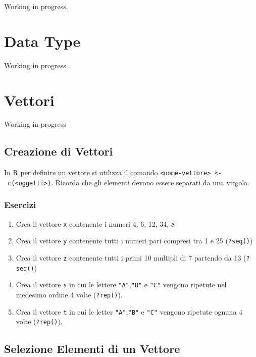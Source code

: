 \documentclass[
]{book}
\providecommand{\tightlist}{%
  \setlength{\itemsep}{0pt}\setlength{\parskip}{0pt}}
\begin{document}
Working in progress.

\hypertarget{data-type}{%
\chapter{Data Type}\label{data-type}}

Working in progress.

\hypertarget{vector}{%
\chapter{Vettori}\label{vector}}

Working in progress

\hypertarget{creazione-di-vettori}{%
\section{Creazione di Vettori}\label{creazione-di-vettori}}

In R per definire un vettore si utilizza il comando \texttt{\textless{}nome-vettore\textgreater{}\ \textless{}-\ c(\textless{}oggetti\textgreater{})}. Ricorda che gli elementi devono essere separati da una virgola.

\hypertarget{esercizi-2}{%
\subsection*{Esercizi}\label{esercizi-2}}

\begin{enumerate}
\def\labelenumi{\arabic{enumi}.}
\tightlist
\item
  Crea il vettore \texttt{x} contenente i numeri 4, 6, 12, 34, 8
\item
  Crea il vettore \texttt{y} contenente tutti i numeri pari compresi tra 1 e 25 (\texttt{?seq()})
\item
  Crea il vettore \texttt{z} contenente tutti i primi 10 multipli di 7 partendo da 13 (\texttt{?seq()})
\item
  Crea il vettore \texttt{s} in cui le lettere \texttt{"A"},\texttt{"B"} e \texttt{"C"} vengono ripetute nel medesimo ordine 4 volte (\texttt{?rep()}).
\item
  Crea il vettore \texttt{t} in cui le letter \texttt{"A"},\texttt{"B"} e \texttt{"C"} vengono ripetute ognuna 4 volte (\texttt{?rep()}).
\end{enumerate}

\hypertarget{selezione-elementi-di-un-vettore}{%
\section{Selezione Elementi di un Vettore}\label{selezione-elementi-di-un-vettore}}
\end{document}

